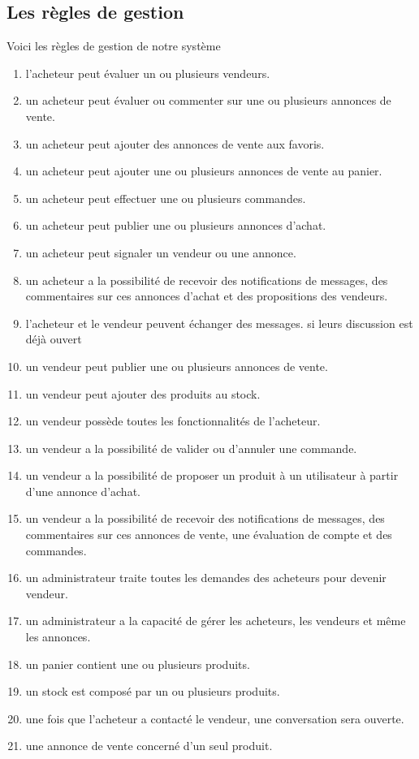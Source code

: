 \documentclass[edit,12pt,a4paper,ChapStyle,oneside,doubleinterligne]{report}
\begin{document}
\subsection{Les règles de gestion}
Voici les règles de gestion de notre système
\begin{enumerate}
    \item l’acheteur peut évaluer un ou plusieurs vendeurs.
    \item un acheteur peut évaluer ou commenter sur une ou plusieurs annonces de vente.
    \item un acheteur peut ajouter des annonces de vente aux favoris.
    \item un acheteur peut ajouter une ou plusieurs annonces de vente au panier.
    \item un acheteur peut effectuer une ou plusieurs commandes.
    \item un acheteur peut publier une ou plusieurs annonces d’achat.
    \item un acheteur peut signaler un vendeur ou une annonce.
    \item un acheteur a la possibilité de recevoir des notifications de messages, des commentaires sur ces annonces d’achat et des propositions des vendeurs.
    \item l’acheteur et le vendeur peuvent échanger des messages. si leurs discussion est déjà ouvert
    \item un vendeur peut publier une ou plusieurs annonces de vente.
    \item un vendeur peut ajouter des produits au stock. 
    \item un vendeur possède toutes les fonctionnalités de l'acheteur.
    \item un vendeur a la possibilité de valider ou d'annuler une commande.
    \item un vendeur a la possibilité de proposer un produit à un utilisateur à partir d'une annonce d'achat.
    \item un vendeur a la possibilité de recevoir des notifications de messages, des commentaires sur ces annonces de vente, une évaluation de compte et des commandes.
    \item un administrateur traite toutes les demandes des acheteurs pour devenir vendeur.
    \item un administrateur a la capacité de gérer les acheteurs, les vendeurs et même les annonces.
    \item un panier contient une ou plusieurs produits.
    \item un stock est composé par un ou plusieurs produits.
    \item une fois que l'acheteur a contacté le vendeur, une conversation sera ouverte.
    \item une annonce de vente concerné d’un seul produit.
\end{enumerate}
\clearpage
\end{document}
